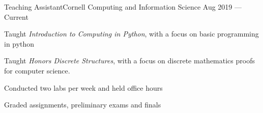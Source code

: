 \documentclass{resume}
\begin{document}
\begin{experience}

    \begin{entry}{Teaching Assistant}{Cornell Computing and Information Science}
        {Aug 2019 --- Current}
        \begin{description}
            \item Taught \emph{Introduction to Computing in Python}, with a
                focus on basic programming in python
            \item Taught \emph{Honors Discrete Structures}, with a focus on
                discrete mathematics proofs for computer science.
            \item Conducted two labs per week and held office hours
            \item Graded assignments, preliminary exams and finals
        \end{description}
    \end{entry}
\end{experience}
\end{document}
